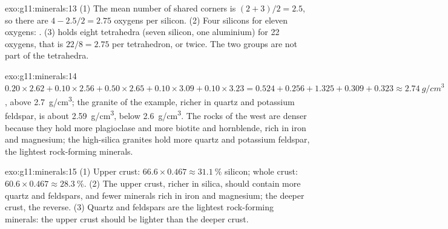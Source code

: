 \begin{solution}{exo:g11:minerals:13}
(1) The mean number of shared corners is $(2 + 3)/2 = 2.5$, so there are
$4 - 2.5/2 = 2.75$ oxygens per silicon. (2) Four silicons for eleven oxygens:
. (3)  holds eight tetrahedra (seven silicon, one
aluminium) for 22 oxygens, that is $22/8 = 2.75$ per tetrahedron, or
 twice. The two  groups are not part of the tetrahedra.
\end{solution}

\begin{solution}{exo:g11:minerals:14}
$0.20 \times 2.62 + 0.10 \times 2.56 + 0.50 \times 2.65 + 0.10 \times 3.09 +
0.10 \times 3.23 = 0.524 + 0.256 + 1.325 + 0.309 + 0.323 \approx
\qty{2.74}{g/cm^3}$, above \qty{2.7}{g/cm^3}; the granite of the example,
richer in quartz and potassium feldspar, is about \qty{2.59}{g/cm^3}, below
\qty{2.6}{g/cm^3}. The rocks of the west are denser because they hold more
plagioclase and more biotite and hornblende, rich in iron and magnesium; the
high-silica granites hold more quartz and potassium feldspar, the lightest
rock-forming minerals.
\end{solution}

\begin{solution}{exo:g11:minerals:15}
(1) Upper crust: $66.6 \times 0.467 \approx \qty{31.1}{\percent}$ silicon;
whole crust: $60.6 \times 0.467 \approx \qty{28.3}{\percent}$. (2) The upper
crust, richer in silica, should contain more quartz and feldspars, and fewer
minerals rich in iron and magnesium; the deeper crust, the reverse. (3) Quartz
and feldspars are the lightest rock-forming minerals: the upper crust should
be lighter than the deeper crust.
\end{solution}

